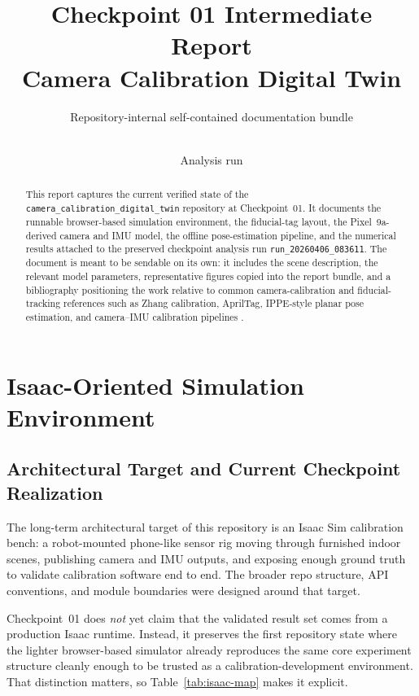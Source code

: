 \documentclass[11pt,a4paper]{article}
\title{\textbf{Checkpoint 01 Intermediate Report}\\[0.2em]
Camera Calibration Digital Twin}
\author{Repository-internal self-contained documentation bundle}
\date{\checkpointcommit\\Analysis run \runid}
\newcommand{\repo}{\texttt{camera\_calibration\_digital\_twin}}
\newcommand{\runid}{\texttt{run\_20260406\_083611}}
\begin{document}
\maketitle

\begin{abstract}
This report captures the current verified state of the \repo{} repository at Checkpoint~01.
It documents the runnable browser-based simulation environment, the fiducial-tag layout, the Pixel~9a-derived camera and IMU model, the offline pose-estimation pipeline, and the numerical results attached to the preserved checkpoint analysis run \runid.
The document is meant to be sendable on its own: it includes the scene description, the relevant model parameters, representative figures copied into the report bundle, and a bibliography positioning the work relative to common camera-calibration and fiducial-tracking references such as Zhang calibration, AprilTag, IPPE-style planar pose estimation, and camera--IMU calibration pipelines \citep{zhang2000flexible,olson2011apriltag,wang2016apriltag2,collins2014ippe,furgale2013unified,rehder2017camimu}.
\end{abstract}

\section{Isaac-Oriented Simulation Environment}

\subsection{Architectural Target and Current Checkpoint Realization}

The long-term architectural target of this repository is an Isaac Sim calibration bench: a robot-mounted phone-like sensor rig moving through furnished indoor scenes, publishing camera and IMU outputs, and exposing enough ground truth to validate calibration software end to end.
The broader repo structure, API conventions, and module boundaries were designed around that target.

Checkpoint~01 does \emph{not} yet claim that the validated result set comes from a production Isaac runtime.
Instead, it preserves the first repository state where the lighter browser-based simulator already reproduces the same core experiment structure cleanly enough to be trusted as a calibration-development environment.
That distinction matters, so Table~\ref{tab:isaac-map} makes it explicit.
\end{document}
